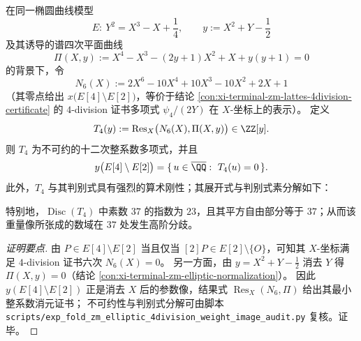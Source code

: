 \begin{conclusion}\label{con:xi-terminal-zm-4division-weight-image}
在同一椭圆曲线模型
\[
E:\ Y^{2}=X^{3}-X+\frac14,
\qquad
y:=X^{2}+Y-\frac12
\]
及其诱导的谱四次平面曲线
\[
\Pi(X,y):=X^{4}-X^{3}-(2y+1)X^{2}+X+y(y+1)=0
\]
的背景下，令
\[
N_{6}(X):=2X^{6}-10X^{4}+10X^{3}-10X^{2}+2X+1
\]
（其零点给出 \(x\bigl(E[4]\setminus E[2]\bigr)\)，等价于结论 \ref{con:xi-terminal-zm-lattes-4division-certificate} 的 \(4\)-division 证书多项式 \(\psi_{4}/(2Y)\) 在 \(X\)-坐标上的表示）。
定义
\[
T_{4}(y):=\operatorname{Res}_{X}\bigl(N_{6}(X),\Pi(X,y)\bigr)\in\ZZ[y].
\]
则 \(T_{4}\) 为不可约的十二次整系数多项式，并且
\[
y\bigl(E[4]\setminus E[2]\bigr)=\{\,u\in\overline{\QQ}:\ T_{4}(u)=0\,\}.
\]
此外，\(T_{4}\) 与其判别式具有强烈的算术刚性；其展开式与判别式素分解如下：

特别地，\(\operatorname{Disc}(T_{4})\) 中素数 \(37\) 的指数为 \(23\)，且其平方自由部分等于 \(37\)；从而该重量像所张成的数域在 \(37\) 处发生高阶分歧。
\end{conclusion}
\begin{proof}[证明要点]
由 \(P\in E[4]\setminus E[2]\) 当且仅当 \([2]P\in E[2]\setminus\{O\}\)，可知其 \(X\)-坐标满足 \(4\)-division 证书六次 \(N_{6}(X)=0\)。
另一方面，由 \(y=X^{2}+Y-\tfrac12\) 消去 \(Y\) 得 \(\Pi(X,y)=0\)（结论 \ref{con:xi-terminal-zm-elliptic-normalization}）。
因此 \(y(E[4]\setminus E[2])\) 正是消去 \(X\) 后的参数像，结果式 \(\operatorname{Res}_{X}(N_{6},\Pi)\) 给出其最小整系数消元证书；
不可约性与判别式分解可由脚本 \texttt{scripts/exp\_fold\_zm\_elliptic\_4division\_weight\_image\_audit.py} 复核。证毕。
\end{proof}


